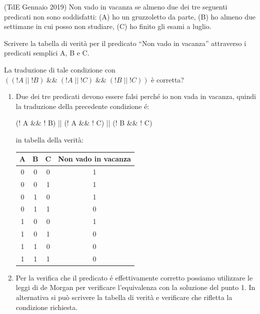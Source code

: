 \begin{Exercise}[label={ex:vacanza}]

(TdE Gennaio 2019) Non vado in vacanza se almeno due dei tre seguenti predicati non sono soddisfatti: (A) ho un gruzzoletto da parte, (B) ho almeno due settimane in cui posso non studiare, (C) ho finito gli esami a luglio.

		\Question Scrivere la tabella di verit\`a per il predicato ``Non vado in vacanza''  attraverso i predicati semplici A, B e C.
		
		\Question La traduzione di tale condizione con $((!A \; || \; !B) \; \&\& \; (!A \; || \; !C) \; \&\& \; (!B \; || \; !C))$ \`e corretta?
\end{Exercise}

\begin{Answer}[ref={ex:vacanza}]

\begin{enumerate}
	\item Due dei tre predicati devono essere falsi perch\'e io non vada in vacanza, quindi la traduzione della precedente condizione \'e:
	
			(! A \&\& ! B) || (! A \&\& ! C) || (! B \&\& ! C)

			in tabella della verit\`a:
			
			\begin{table}[H]
\centering
\begin{tabular}{c|c|c|c}
A & B & C & Non vado in vacanza \\ \hline
0 & 0 & 0 & 1                   \\
0 & 0 & 1 & 1                   \\
0 & 1 & 0 & 1                   \\
0 & 1 & 1 & 0                   \\
1 & 0 & 0 & 1                   \\
1 & 0 & 1 & 0                   \\
1 & 1 & 0 & 0                   \\
1 & 1 & 1 & 0                  
\end{tabular}
\end{table}

	\item Per la verifica che il predicato \'e effettivamente corretto possiamo utilizzare le leggi di de Morgan per verificare l'equivalenza con la soluzione del punto 1. In alternativa si pu\`o scrivere la tabella di verit\`a e verificare che rifletta la condizione richiesta.

\end{enumerate}

\end{Answer}